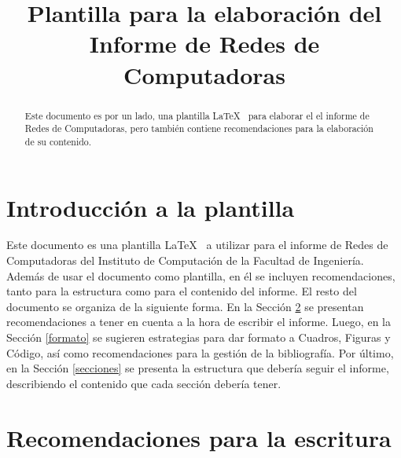 \documentclass[conference]{IEEEtran}
\begin{document}
\title{Plantilla para la elaboración del Informe de Redes de Computadoras}


\author{
}

\maketitle

\begin{abstract}
Este documento es por un lado, una plantilla \LaTeX~ para elaborar el el informe de Redes de Computadoras, pero también contiene recomendaciones para la elaboración de su contenido.
\end{abstract}



\section{Introducción a la plantilla}
\label{intro}
Este documento es una plantilla \LaTeX~ a utilizar para el informe de Redes de Computadoras del Instituto de Computación de la Facultad de Ingeniería. Además de usar el documento como plantilla, en él se incluyen recomendaciones, tanto para la estructura como para el contenido del informe. El resto del documento se organiza de la siguiente forma. En la Sección \ref{escritura} se presentan recomendaciones a tener en cuenta a la hora de escribir el informe. Luego, en la Sección \ref{formato} se sugieren estrategias para dar formato a Cuadros, Figuras y Código, así como recomendaciones para la gestión de la bibliografía. Por último, en la Sección \ref{secciones} se presenta la estructura que debería seguir el informe, describiendo el contenido que cada sección debería tener. 

\section{Recomendaciones para la escritura}
\label{escritura}
\end{document}
